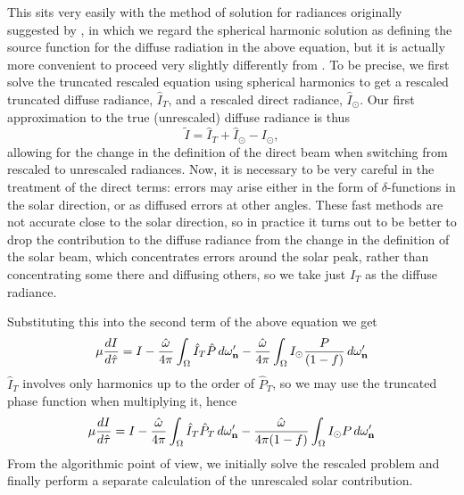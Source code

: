 This sits very easily with the method of solution for radiances originally
suggested by \cite{Kourganov55}, in which we regard the spherical harmonic
solution as defining the source function for the diffuse radiation in the 
above equation, but it is actually more convenient to proceed very slightly
differently from \cite{Nakajima88}. To be precise, we first solve the 
truncated rescaled equation
using spherical harmonics to get a rescaled truncated diffuse radiance, $\hat 
I_T$, and a rescaled direct radiance, $\hat I_\odot$. Our first approximation
to the true (unrescaled) diffuse radiance is thus
\begin{equation}
\tilde I = \hat I_T + \hat I_\odot -I_\odot,
\end{equation}
allowing for the change in the definition of the direct beam when
switching from rescaled to unrescaled radiances. Now, it is necessary to
be very careful in the treatment of the direct terms: errors may arise
either in the form of $\delta$-functions in the solar direction, or as
diffused errors at other angles. These fast methods are not accurate
close to the solar direction, so in practice it turns out to be better
to drop the contribution to the diffuse radiance from the change in the
definition of the solar beam, which concentrates errors around the solar
peak, rather than concentrating some there and diffusing others, so we
take just $\hat I_T$ as the diffuse radiance.


Substituting this into the second term of the above equation we get
\begin{equation}
\mu {{dI}\over{d\hat\tau}} = I 
-{\hat\omega\over{4\pi}} \int_\Omega 
\hat I_T  \hat P \, d\omega_\mathbf{n}' 
- {\hat\omega\over{4\pi}} \int_\Omega I_\odot {P\over{(1-f)}} 
\, d\omega_\mathbf{n}'
\end{equation}
$\hat I_T$ involves only harmonics up to the order of $\hat P_T$, so we
may use the truncated phase function when multiplying it, hence
\begin{equation}
\mu {{dI}\over{d\hat\tau}} = I
-{\hat\omega\over{4\pi}} \int_\Omega
\hat I_T \hat P_T \, d\omega_\mathbf{n}'
-{\hat\omega\over{4\pi (1-f)}} \int_\Omega
I_\odot P \, d\omega_\mathbf{n}'
\end{equation}
From the algorithmic point of view, we initially solve the rescaled problem
and finally perform a separate calculation of the unrescaled solar
contribution.

